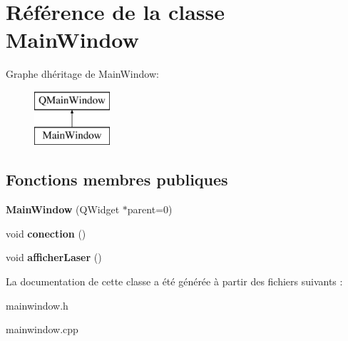 \hypertarget{class_main_window}{}\section{Référence de la classe Main\+Window}
\label{class_main_window}
Graphe d\textquotesingle{}héritage de Main\+Window\+:\begin{figure}[H]
\begin{center}
\leavevmode
\includegraphics[height=2.000000cm]{class_main_window}
\end{center}
\end{figure}
\subsection*{Fonctions membres publiques}
\begin{DoxyCompactItemize}
\item 
\mbox{\label{class_main_window_a8b244be8b7b7db1b08de2a2acb9409db}} 
{\bfseries Main\+Window} (Q\+Widget $\ast$parent=0)
\item 
\mbox{\label{class_main_window_aeb1e00c565eda48ab57ff6cb4c61f7fd}} 
void {\bfseries conection} ()
\item 
\mbox{\label{class_main_window_a23aad132218444e5ee6c24651b14628d}} 
void {\bfseries afficher\+Laser} ()
\end{DoxyCompactItemize}


La documentation de cette classe a été générée à partir des fichiers suivants \+:\begin{DoxyCompactItemize}
\item 
mainwindow.\+h\item 
mainwindow.\+cpp\end{DoxyCompactItemize}
